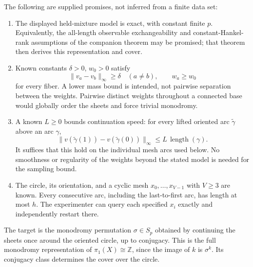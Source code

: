 \documentclass[11pt]{article}
\theoremstyle{remark}\newtheorem{remark}[theorem]{Remark}
\begin{document}
The following are supplied promises, not inferred from a finite data set:
\begin{enumerate}[label=(P\arabic*)]
\item The displayed held-mixture model is exact, with constant finite $p$. Equivalently, the all-length observable exchangeability and constant-Hankel-rank assumptions of the companion theorem may be promised; that theorem then derives this representation and cover.
\item Known constants $\delta>0$, $w_0>0$ satisfy
\[
 \|v_a-v_b\|_\infty\geq\delta\quad(a\ne b),\qquad w_a\geq w_0
\]
for every fiber. A lower mass bound is intended, not pairwise separation between the weights. Pairwise distinct weights throughout a connected base would globally order the sheets and force trivial monodromy.
\item A known $L\geq0$ bounds continuation speed: for every lifted oriented arc $\widetilde\gamma$ above an arc $\gamma$,
\[
 \|v(\widetilde\gamma(1))-v(\widetilde\gamma(0))\|_\infty\leq L\,\operatorname{length}(\gamma).
\]
It suffices that this hold on the individual mesh arcs used below. No smoothness or regularity of the weights beyond the stated model is needed for the sampling bound.
\item The circle, its orientation, and a cyclic mesh $x_0,\ldots,x_{V-1}$ with $V\geq3$ are known. Every consecutive arc, including the last-to-first arc, has length at most $h$. The experimenter can query each specified $x_i$ exactly and independently restart there.
\end{enumerate}
The target is the monodromy permutation $\sigma\in S_p$ obtained by continuing the sheets once around the oriented circle, up to conjugacy. This is the full monodromy representation of $\pi_1(X)\cong\mathbb Z$, since the image of $k$ is $\sigma^k$. Its conjugacy class determines the cover over the circle.
\end{document}
